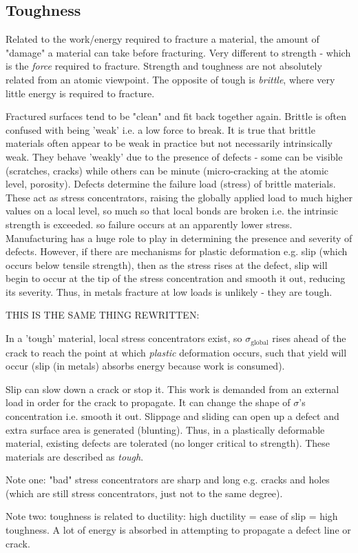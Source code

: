 \subsection{Toughness}
Related to the work/energy required to fracture a material, the amount of "damage" a material can take before fracturing. Very different to strength - which is the \emph{force} required to fracture. Strength and toughness are not absolutely related from an atomic viewpoint. The opposite of tough is \emph{brittle}, where very little energy is required to fracture.

Fractured surfaces tend to be "clean" and fit back together again. Brittle is often confused with being 'weak' i.e. a low force to break. It is true that brittle materials often appear to be weak in practice but not necessarily intrinsically weak. They behave 'weakly' due to the presence of defects - some can be visible (scratches, cracks) while others can be minute (micro-cracking at the atomic level, porosity). Defects determine the failure load (stress) of brittle materials. These act as stress concentrators, raising the globally applied load to much higher values on a local level, so much so that local bonds are broken i.e. the intrinsic strength is exceeded. so failure occurs at an apparently lower stress. Manufacturing has a huge role to play in determining the presence and severity of defects. However, if there are mechanisms for plastic deformation e.g. slip (which occurs below tensile strength), then as the stress rises at the defect, slip will begin to occur at the tip of the stress concentration and smooth it out, reducing its severity. Thus, in metals fracture at low loads is unlikely - they are tough.

THIS IS THE SAME THING REWRITTEN:

In a 'tough' material, local stress concentrators exist, so \(\sigma_{\textrm{global}}\) rises ahead of the crack to reach the point at which \emph{plastic} deformation occurs, such that yield will occur (slip (in metals) absorbs energy because work is consumed).

Slip can slow down a crack or stop it. This work is demanded from an external load in order for the crack to propagate. It can change the shape of \(\sigma\)'s concentration i.e. smooth it out. Slippage and sliding can open up a defect and extra surface area is generated (blunting). Thus, in a plastically deformable material, existing defects are tolerated (no longer critical to strength). These materials are described as \emph{tough}.

Note one: "bad" stress concentrators are sharp and long e.g. cracks and holes (which are still stress concentrators, just not to the same degree).

Note two: toughness is related to ductility: high ductility = ease of slip = high toughness. A lot of energy is absorbed in attempting to propagate a defect line or crack.
